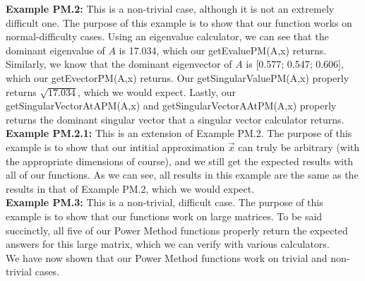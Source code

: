 \documentclass{article}
\begin{document}
\noindent \textbf{Example PM.2: }This is a non-trivial case, although it is not an extremely difficult one. The purpose of this example is to show that our function works on normal-difficulty cases. Using an eigenvalue calculator, we can see that the dominant eigenvalue of $A$ is 17.034, which our getEvaluePM(A,x) returns. Similarly, we know that the dominant eigenvector of $A$ is [0.577; 0.547; 0.606], which our getEvectorPM(A,x) returns. Our getSingularValuePM(A,x) properly returns $\sqrt{17.034}$, which we would expect. Lastly, our  getSingularVectorAtAPM(A,x) and getSingularVectorAAtPM(A,x) properly returns the dominant singular vector that a singular vector calculator returns.\\

\noindent \textbf{Example PM.2.1: }This is an extension of Example PM.2. The purpose of this example is to show that our intitial approximation $\vec{x}$ can truly be arbitrary (with the appropriate dimensions of course), and we still get the expected results with all of our functions. As we can see, all results in this example are the same as the results in that of Example PM.2, which we would expect.\\

\noindent \textbf{Example PM.3: }This is a non-trivial, difficult case. The purpose of this example is to show that our functions work on large matrices. To be said succinctly, all five of our Power Method functions properly return the expected answers for this large matrix, which we can verify with various calculators.\\

\noindent We have now shown that our Power Method functions work on trivial and non-trivial cases.
\end{document}
